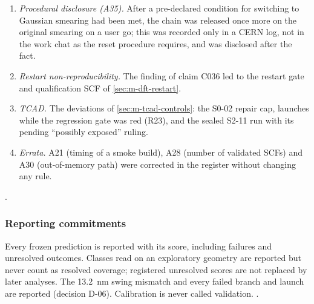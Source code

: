 \begin{enumerate}
\item \emph{Procedural disclosure (A35).} After a pre-declared condition for switching  to Gaussian
smearing had been met, the chain was released once more on the original smearing on a user go; this was recorded only
in a CERN log, not in the work chat as the reset procedure requires, and was disclosed after the fact. %
\item \emph{Restart non-reproducibility.} The finding of claim C036 led to the restart gate and qualification SCF of
\cref{sec:m-dft-restart}. %
\item \emph{TCAD.} The deviations of \cref{sec:m-tcad-controls}: the S0-02 repair cap, launches while the regression
gate was red (R23), and the sealed S2-11 run with its pending ``possibly exposed'' ruling. %
\item \emph{Errata.} A21 (timing of a smoke build), A28 (number of validated SCFs) and A30 (out-of-memory path) were
corrected in the register without changing any rule. %
\end{enumerate}
.

\subsubsection{Reporting commitments}
\label{sec:m-reg-reporting}

Every frozen prediction is reported with its score, including failures and unresolved outcomes. Classes read on an
exploratory geometry are reported but never count as resolved coverage; registered unresolved scores are not
replaced by later analyses. The \SI{13.2}{nm} swing mismatch and every failed branch and launch are reported (decision
D-06). Calibration is never called validation. %
.
